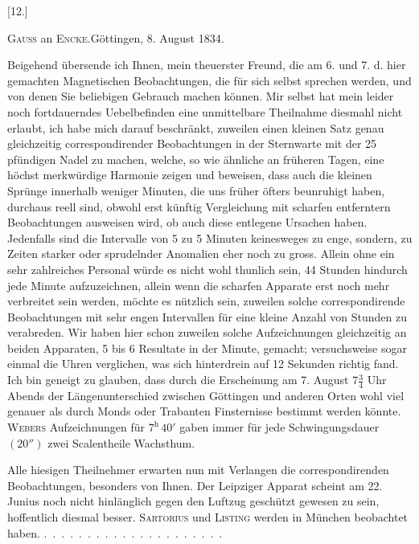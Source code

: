\clearpage\begingroup{}
\begin{center}[12.]\end{center}
\begin{center}\textsc{Gauss} an \textsc{Encke}.\quad Göttingen, 8. August 1834.\end{center}
\noindent\hspace*{\parindent}Beigehend übersende ich Ihnen, mein theuerster Freund, die am 6. und
7. d. hier gemachten Magnetischen Beobachtungen, die für sich selbst sprechen
werden, und von denen Sie beliebigen Gebrauch machen können. Mir selbst
hat mein leider noch fortdauerndes Uebelbefinden eine unmittelbare Theilnahme
diesmahl nicht erlaubt, ich habe mich darauf beschränkt, zuweilen einen kleinen
Satz genau gleichzeitig correspondirender Beobachtungen in der Sternwarte
mit der 25 pfündigen Nadel zu machen, welche, so wie ähnliche an früheren
Tagen, eine höchst merkwürdige Harmonie zeigen und beweisen, dass auch
die kleinen Sprünge innerhalb weniger Minuten, die uns früher öfters beunruhigt
haben, durchaus reell sind, obwohl erst künftig Vergleichung mit
scharfen entferntern Beobachtungen ausweisen wird, ob auch diese 
entlegene Ursachen haben. Jedenfalls sind die Intervalle von 5 zu 5 Minuten
keinesweges zu enge, sondern, zu Zeiten starker oder sprudelnder Anomalien
eher noch zu gross. Allein ohne ein sehr zahlreiches Personal würde es nicht
wohl thunlich sein, 44 Stunden hindurch jede Minute aufzuzeichnen, allein
wenn die scharfen Apparate erst noch mehr verbreitet sein werden, möchte
es nützlich sein, zuweilen solche correspondirende Beobachtungen mit sehr
engen Intervallen für eine kleine Anzahl von Stunden zu verabreden. Wir
haben hier schon zuweilen solche Aufzeichnungen gleichzeitig an beiden Apparaten,
5 bis 6 Resultate in der Minute, gemacht; versuchsweise sogar einmal
 die Uhren verglichen, was sich hinterdrein auf 12 Sekunden richtig
fand. Ich bin geneigt zu glauben, dass durch die Erscheinung am 7. August
\clearpage{}
\noindent \(7\frac{3}{4}\) Uhr Abends der Längenunterschied zwischen Göttingen und anderen Orten
wohl viel genauer als durch Monds oder Trabanten Finsternisse bestimmt
werden könnte. \textsc{Webers} Aufzeichnungen für \(7^{\mathrm{h}}\,40'\) gaben immer für jede
Schwingungsdauer \((20'')\) zwei Scalentheile Wachsthum.

Alle hiesigen Theilnehmer erwarten nun mit Verlangen die correspondirenden
Beobachtungen, besonders von Ihnen. Der Leipziger Apparat scheint
am 22. Junius noch nicht hinlänglich gegen den Luftzug geschützt gewesen
zu sein, hoffentlich diesmal besser. \textsc{Sartorius} und \textsc{Listing} werden in München
beobachtet haben. \mbox{. . . . . . . . . . . . . . . . . . . . .}
\clearpage\endgroup
